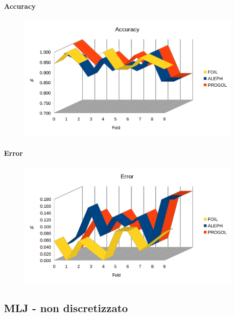 \paragraph{Accuracy}
\begin{figure}[H]
	\includegraphics[width=1.1\textwidth]{img/datasetGraph/mlj/discr/accuracy.png}
	\label{mljdiscr-Accuracy}
\end{figure}
\paragraph{Error}
\begin{figure}[H]
	\includegraphics[width=1.1\textwidth]{img/datasetGraph/mlj/discr/error.png}
	\label{mljdiscr-Error}
\end{figure}

\subsection{MLJ - non discretizzato}

